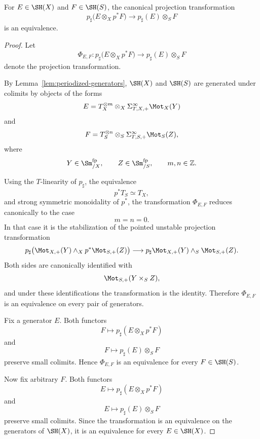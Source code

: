\begin{theorem}
\label{thm:stable-smooth-projection}
For \(E\in\SH(X)\) and \(F\in\SH(S)\), the canonical projection
transformation
\[
    p_\sharp\bigl(E\otimes_Xp^*F\bigr)
    \longrightarrow
    p_\sharp(E)\otimes_SF
\]
is an equivalence.
\end{theorem}

\begin{proof}
Let
\[
    \Phi_{E,F}:
    p_\sharp\bigl(E\otimes_Xp^*F\bigr)
    \longrightarrow
    p_\sharp(E)\otimes_SF
\]
denote the projection transformation.

By Lemma~\ref{lem:periodized-generators}, \(\SH(X)\) and \(\SH(S)\) are
generated under colimits by objects of the forms
\[
    E=
    T_X^{\otimes m}
    \otimes_X
    \Sigma_{T,X,+}^\infty\Mot_X(Y)
\]
and
\[
    F=
    T_S^{\otimes n}
    \otimes_S
    \Sigma_{T,S,+}^\infty\Mot_S(Z),
\]
where
\[
    Y\in\Sm^{\mathrm{fp}}_{/X},
    \qquad
    Z\in\Sm^{\mathrm{fp}}_{/S},
    \qquad
    m,n\in\mathbb Z.
\]

Using the \(T\)-linearity of \(p_\sharp\), the equivalence
\[
    p^*T_S\simeq T_X,
\]
and strong symmetric monoidality of \(p^*\), the transformation
\(\Phi_{E,F}\) reduces canonically to the case
\[
    m=n=0.
\]
In that case it is the stabilization of the pointed unstable projection
transformation
\[
\begin{aligned}
    p_\sharp\bigl(
      \Mot_{X,+}(Y)
      \wedge_X
      p^*\Mot_{S,+}(Z)
    \bigr)
    \longrightarrow
    p_\sharp\Mot_{X,+}(Y)
    \wedge_S
    \Mot_{S,+}(Z).
\end{aligned}
\]
Both sides are canonically identified with
\[
    \Mot_{S,+}(Y\times_S Z),
\]
and under these identifications the transformation is the identity.
Therefore \(\Phi_{E,F}\) is an equivalence on every pair of generators.

Fix a generator \(E\).  Both functors
\[
    F\longmapsto
    p_\sharp(E\otimes_Xp^*F)
\]
and
\[
    F\longmapsto
    p_\sharp(E)\otimes_SF
\]
preserve small colimits.  Hence \(\Phi_{E,F}\) is an equivalence for every
\(F\in\SH(S)\).

Now fix arbitrary \(F\).  Both functors
\[
    E\longmapsto
    p_\sharp(E\otimes_Xp^*F)
\]
and
\[
    E\longmapsto
    p_\sharp(E)\otimes_SF
\]
preserve small colimits.  Since the transformation is an equivalence on the
generators of \(\SH(X)\), it is an equivalence for every
\(E\in\SH(X)\).
\end{proof}

